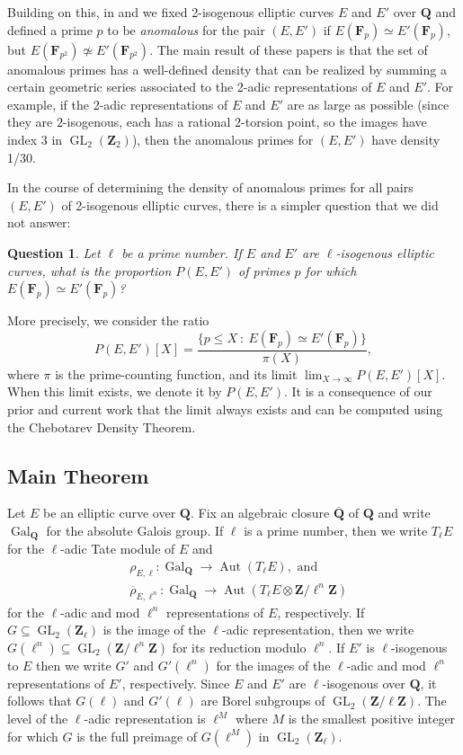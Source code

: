 \documentclass{amsart}
\newcommand{\Gal}{\operatorname{Gal}}
\newcommand{\Aut}{\operatorname{Aut}}
\newcommand{\Zl}{\mathbf{Z}_{\ell}}
\newcommand{\Z}{\mathbf{Z}}
\newcommand{\F}{\mathbf{F}}
\newcommand{\Q}{\mathbf{Q}}
\newcommand{\GL}{\operatorname{GL}}
\numberwithin{equation}{section}
\theoremstyle{plain}
\newtheorem{qu}{Question}
\theoremstyle{remark}
\begin{document}
Building on this, in \cite{ck} and \cite{rnt} we fixed 2-isogenous elliptic curves $E$ and $E'$ over $\Q$ and defined a prime $p$ to be \emph{anomalous} for the pair $(E,E')$ if $E(\F_p) \simeq E'(\F_p)$, but $E(\F_{p^2}) \not \simeq E'(\F_{p^2})$.  The main result of these papers is that the set of anomalous primes has a well-defined density that can be realized by summing a certain geometric series associated to the 2-adic representations of $E$ and $E'$.  For example, if the 2-adic representations of $E$ and $E'$ are as large as possible (since they are $2$-isogenous, each has a rational $2$-torsion point, so the images have index $3$ in $\GL_{2}(\Z_2)$), then the anomalous primes for $(E,E')$ have density 1/30. 

In the course of determining the density of anomalous primes for all pairs $(E,E')$ of 2-isogenous elliptic curves, there is a simpler question that we did not answer:

\begin{qu}
Let $\ell$ be a prime number.  If $E$ and $E'$ are $\ell$-isogenous elliptic curves, what is the proportion $P(E,E')$ of primes $p$ for which $E(\F_p) \simeq E'(\F_p)$?
\end{qu}

More precisely, we consider the ratio
\[
P(E,E')[X] = \frac{\lbrace p \leq X~:~ E(\F_p) \simeq E'(\F_p) \rbrace}{\pi(X)},
\]
where $\pi$ is the prime-counting function, and its limit $\lim_{X \to \infty} P(E,E')[X]$.  When this limit exists, we denote it by $P(E,E')$.   It is a consequence of our prior and current work that the limit always exists and can be computed using the Chebotarev Density Theorem. 

\subsection{Main Theorem} Let $E$ be an elliptic curve over $\Q$.  Fix an algebraic closure $\overline{\Q}$ of $\Q$ and write $\Gal_\Q$ for the absolute Galois group.  If $\ell$ is a prime number, then we write $T_\ell E$ for the $\ell$-adic Tate module of $E$ and 
\begin{align*}
&\rho_{E,\ell}: \Gal_\Q \to \Aut (T_\ell E), \text{ and} \\
&\overline{\rho}_{E,\ell^n}: \Gal_\Q \to \Aut (T_\ell E \otimes \Z/\ell^n\Z) 
\end{align*}
for the $\ell$-adic and mod $\ell^n$ representations of $E$, respectively.  If $G \subseteq \GL_2(\Zl)$ is the image of the $\ell$-adic representation, then we write $G(\ell^n) \subseteq \GL_2(\Z/\ell^n\Z)$ for its reduction modulo $\ell^n$. If $E'$ is $\ell$-isogenous to $E$ then we write  $G'$ and $G'(\ell^n)$ for the images of the $\ell$-adic and mod $\ell^n$ representations of $E'$, respectively.  Since $E$ and $E'$ are $\ell$-isogenous over $\Q$, it follows that $G(\ell)$ and $G'(\ell)$ are Borel subgroups of $\GL_2(\Z/\ell\Z)$.  The level  of the $\ell$-adic representation is $\ell^M$ where $M$ is the smallest positive integer for which $G$ is the full preimage of $G(\ell^M)$ in $\GL_2(\Z_\ell)$.
\end{document}

